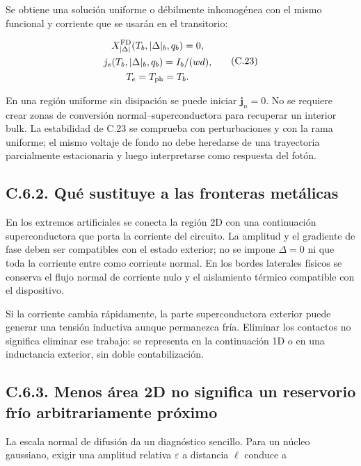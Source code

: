 \documentclass[
  spanish,
  10pt,
  a4paper,
]{article}
\begin{document}
Se obtiene una solución uniforme o débilmente inhomogénea con el mismo
funcional y corriente que se usarán en el transitorio:

\[
\begin{gathered}
X_{|\Delta|}^{\rm FD}(T_b,|\Delta|_b,q_b)=0,\\
j_s(T_b,|\Delta|_b,q_b)=I_b/(wd),\\
T_e=T_{\rm ph}=T_b.
\end{gathered} \tag{C.23}
\]

En una región uniforme sin disipación se puede iniciar
\(\mathbf j_n=0\). No se requiere crear zonas de conversión
normal--superconductora para recuperar un interior bulk. La estabilidad
de C.23 se comprueba con perturbaciones y con la rama uniforme; el mismo
voltaje de fondo no debe heredarse de una trayectoria parcialmente
estacionaria y luego interpretarse como respuesta del fotón.

\subsection{C.6.2. Qué sustituye a las fronteras
metálicas}\label{c.6.2.-quuxe9-sustituye-a-las-fronteras-metuxe1licas}

En los extremos artificiales se conecta la región 2D con una
continuación superconductora que porta la corriente del circuito. La
amplitud y el gradiente de fase deben ser compatibles con el estado
exterior; no se impone \(\Delta=0\) ni que toda la corriente entre como
corriente normal. En los bordes laterales físicos se conserva el flujo
normal de corriente nulo y el aislamiento térmico compatible con el
dispositivo.

Si la corriente cambia rápidamente, la parte superconductora exterior
puede generar una tensión inductiva aunque permanezca fría. Eliminar los
contactos no significa eliminar ese trabajo: se representa en la
continuación 1D o en una inductancia exterior, sin doble
contabilización.

\subsection{C.6.3. Menos área 2D no significa un reservorio frío
arbitrariamente
próximo}\label{c.6.3.-menos-uxe1rea-2d-no-significa-un-reservorio-fruxedo-arbitrariamente-pruxf3ximo}

La escala normal de difusión da un diagnóstico sencillo. Para un núcleo
gaussiano, exigir una amplitud relativa \(\varepsilon\) a distancia
\(\ell\) conduce a
\end{document}
